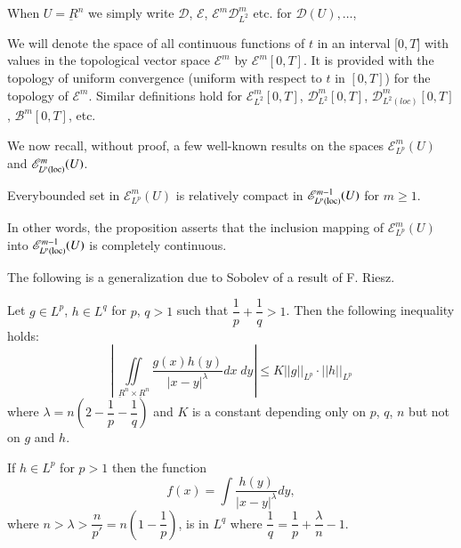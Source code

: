 When $U=\underbar{R}^n$ we simply write $\mathscr{D}$, $\mathscr{E}$,
$\mathscr{E}^m \mathscr{D}^m_{L^2}$ etc. for $\mathscr{D}(U), \ldots$, 

We will denote the space of all continuous functions of $t$ in an
interval [$0, T$] with values in the topological vector space
$\mathscr{E}^m$ by $\mathscr{E}^m [0, T]$. It is provided with the
topology of uniform convergence (uniform with respect to $t$ in $[0,
  T]$) for the topology of $\mathscr{E}^m$. Similar definitions hold
for $\mathscr{E}^m_{L^2}[0, T]$,  $\mathscr{D}^m_{L^2} [0, T]$,  
$\mathscr{D}^m_{L^2(loc)} [0, T]$,  $\mathscr{B}^m[0, T]$,  etc. 

We now recall, without proof, a few well-known results on the
spa\-ces $\mathscr{E}^m_{L^p}(U)$ and  $\mathscr{E}^m_{L^p (\operatorname{loc})}(U)$. 

\begin{proposition}[Rellich]\label{chap1-sec1-prop1}
Every\pageoriginale bounded set in $\mathscr{E}^m_{L^p}(U)$ is 
relatively compact in $\mathscr{E}^{m-1}_{L^p (\operatorname{loc})} (U)$ for $m \geq 
1$. 

In other words,  the proposition asserts that the inclusion mapping of
$\mathscr{E}^m_{L^p}(U)$ into $\mathscr{E}^{m-1}_{L^p (\operatorname{loc})}(U)$ is
completely continuous. 

The following is a generalization due to Sobolev of a result of
F. Riesz. 
\end{proposition}

\begin{proposition}\label{chap1-sec1-prop2} %
Let $g \in L^p$, $h \in L^q$ for $p$, $q > 1$  such
that $\dfrac{1}{p}+\dfrac{1}{q} > 1$. Then the following inequality
holds: 
\begin{equation*}
\left|  ~ \iint\limits_{\underbar{R}^n \times\underbar{R}^n}
\frac{g(x) h (y)}{|x - y|^{\lambda}} dx \; dy \right| \leq K || g
||_{L^p} \cdot || h ||_{L^p} \tag{1.4}\label{chap1-eq1.4}
\end{equation*}
where $\lambda = n\left(2-\dfrac{1}{p}-\dfrac{1}{q}\right)$ and $K$ is a
constant depending only on $p$, $q$, $n$ but not on $g$ and $h$. 
\end{proposition}

\begin{proposition}[Sobolev]\label{chap1-sec1-prop3} %
 If $h \in L^{p}$ for $p> 1$ then the function 
\begin{equation*}
f(x) = \int \frac{h(y)}{|x-y|^{\lambda}}  dy,  \tag{1.5}\label{chap1-eq1.5}
\end{equation*}
where $n > \lambda > \dfrac{n}{p'}= n(1-\dfrac{1}{p})$,  is in 
$L^{q}$ where  $\dfrac{1}{q} = \dfrac{1}{p} + \dfrac{\lambda}{n}-1$. 
\end{proposition}

